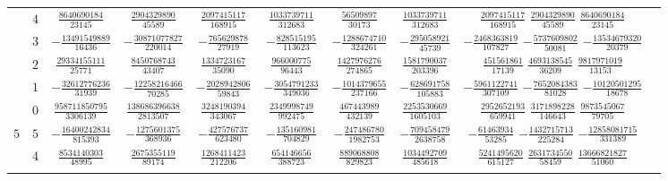 \begin{table}
\begin{center}
\begin{tabular}{cccccccccc}
           &  $4$  &  $ \frac{  8640690184}{  23145}$  &  $ \frac{  2904329890}{  45589}$  &  $ \frac{ 2097415117}{  168915}$  &  $ \frac{1033739711}{  312683}$  &  $ \frac{  56509897}{   30173}$  &  $ \frac{1033739711}{  312683}$  &  $ \frac{ 2097415117}{  168915}$  $ \frac{  2904329890}{  45589}$  $ \frac{  8640690184}{  23145}$  \\ \addlinespace
           &  $3$  &  $-\frac{ 13491549889}{  16436}$  &  $-\frac{ 30871077827}{ 220014}$  &  $-\frac{  765629878}{   27919}$  &  $-\frac{ 828515195}{  113623}$  &  $-\frac{1288674710}{  324261}$  &  $-\frac{ 295058921}{   45739}$  &  $-\frac{ 2468363819}{  107827}$  $-\frac{  5737609802}{  50081}$  $-\frac{ 13534679320}{  20379}$  \\ \addlinespace
           &  $2$  &  $ \frac{ 29334155111}{  25771}$  &  $ \frac{  8450768743}{  43407}$  &  $ \frac{ 1334723167}{   35090}$  &  $ \frac{ 966000775}{   96443}$  &  $ \frac{1427976276}{  274865}$  &  $ \frac{1581790037}{  203396}$  &  $ \frac{  451561861}{   17139}$  $ \frac{  4693138545}{  36209}$  $ \frac{  9817971019}{  13153}$  \\ \addlinespace
           &  $1$  &  $-\frac{ 32612776236}{  31939}$  &  $-\frac{ 12258216466}{  70285}$  &  $-\frac{ 2028942806}{   59843}$  &  $-\frac{3054791233}{  349036}$  &  $-\frac{1014379655}{  237166}$  &  $-\frac{ 628691758}{  105883}$  &  $-\frac{ 5961122741}{  307109}$  $-\frac{  7652084383}{  81028}$  $-\frac{ 10120501295}{  18678}$  \\ \addlinespace
           &  $0$  &  $ \frac{958711850795}{3306139}$  &  $ \frac{138686396638}{2813507}$  &  $ \frac{ 3248190394}{  343067}$  &  $ \frac{2349998749}{  992475}$  &  $ \frac{ 467443989}{  432139}$  &  $ \frac{2253530669}{ 1605103}$  &  $ \frac{ 2952652193}{  659941}$  $ \frac{  3171898228}{ 146643}$  $ \frac{  9873545067}{  79705}$  \\ \addlinespace
      $5$  &  $5$  &  $-\frac{ 16400242834}{ 815393}$  &  $-\frac{  1275601375}{ 368936}$  &  $-\frac{  427576737}{  623480}$  &  $-\frac{ 135160981}{  704829}$  &  $-\frac{ 247486780}{ 1982753}$  &  $-\frac{ 709458479}{ 2638758}$  &  $-\frac{   61463934}{   53285}$  $-\frac{  1432715713}{ 225284}$  $-\frac{ 12858081715}{ 331389}$  \\ \addlinespace
           &  $4$  &  $ \frac{  8534140303}{  48995}$  &  $ \frac{  2675355119}{  89174}$  &  $ \frac{ 1268411423}{  212206}$  &  $ \frac{ 654146656}{  388723}$  &  $ \frac{ 889068808}{  829823}$  &  $ \frac{1034492709}{  485618}$  &  $ \frac{ 5241495620}{  615127}$  $ \frac{  2631734550}{  58459}$  $ \frac{ 13666821827}{  51060}$  \\ \addlinespace

\end{tabular}
\end{center}
\end{table}
